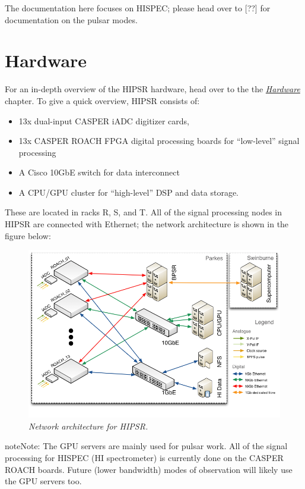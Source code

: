 \documentclass[letterpaper,10pt,english]{sphinxmanual}
\begin{document}
The documentation here focuses on HISPEC; please head over to {[}??{]} for documentation
on the pulsar modes.


\section{Hardware}
\label{user_guide:hardware}
For an in-depth overview of the HIPSR hardware, head over to the
the {\hyperref[hardware:hardware-chapter]{\emph{Hardware}}} chapter. To give a quick overview, HIPSR consists of:
\begin{itemize}
\item {} 
13x dual-input CASPER iADC digitizer cards,

\item {} 
13x CASPER ROACH FPGA digital processing boards for ``low-level'' signal processing

\item {} 
A Cisco 10GbE switch for data interconnect

\item {} 
A CPU/GPU cluster for ``high-level'' DSP and data storage.

\end{itemize}

These are located in racks R, S, and T. All of the signal processing nodes in HIPSR
are connected with Ethernet; the network architecture is shown in the figure below:
\begin{figure}[htbp]
\centering
\capstart

\includegraphics{HIPSR_arch.png}
\caption{\emph{Network architecture for HIPSR.}}\end{figure}

\begin{notice}{note}{Note:}
The GPU servers are mainly used for pulsar work. All of the signal processing for HISPEC
(HI spectrometer) is currently done on the CASPER ROACH boards. Future (lower bandwidth)
modes of observation will likely use the GPU servers too.
\end{notice}
\end{document}
